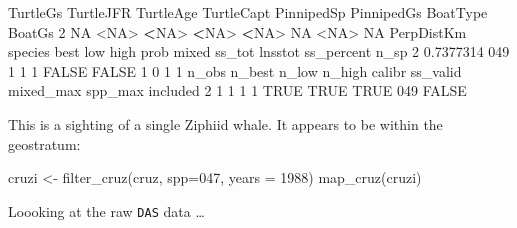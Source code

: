 \documentclass[
]{book}
\newenvironment{Shaded}{\begin{snugshade}}{\end{snugshade}}
\newcommand{\AttributeTok}[1]{\textcolor[rgb]{0.77,0.63,0.00}{#1}}
\newcommand{\ConstantTok}[1]{\textcolor[rgb]{0.00,0.00,0.00}{#1}}
\newcommand{\DecValTok}[1]{\textcolor[rgb]{0.00,0.00,0.81}{#1}}
\newcommand{\ErrorTok}[1]{\textcolor[rgb]{0.64,0.00,0.00}{\textbf{#1}}}
\newcommand{\FloatTok}[1]{\textcolor[rgb]{0.00,0.00,0.81}{#1}}
\newcommand{\FunctionTok}[1]{\textcolor[rgb]{0.00,0.00,0.00}{#1}}
\newcommand{\NormalTok}[1]{#1}
\newcommand{\OtherTok}[1]{\textcolor[rgb]{0.56,0.35,0.01}{#1}}
\newcommand{\SpecialCharTok}[1]{\textcolor[rgb]{0.00,0.00,0.00}{#1}}
\newcommand{\StringTok}[1]{\textcolor[rgb]{0.31,0.60,0.02}{#1}}
\begin{document}
\begin{Shaded}
\begin{Highlighting}[]
\NormalTok{  TurtleGs TurtleJFR TurtleAge TurtleCapt PinnipedSp PinnipedGs BoatType BoatGs}
\DecValTok{2}       \ConstantTok{NA}      \SpecialCharTok{\textless{}}\ConstantTok{NA}\SpecialCharTok{\textgreater{}}      \ErrorTok{\textless{}}\ConstantTok{NA}\SpecialCharTok{\textgreater{}}       \ErrorTok{\textless{}}\ConstantTok{NA}\SpecialCharTok{\textgreater{}}       \ErrorTok{\textless{}}\ConstantTok{NA}\SpecialCharTok{\textgreater{}}         \ConstantTok{NA}     \SpecialCharTok{\textless{}}\ConstantTok{NA}\SpecialCharTok{\textgreater{}}     \ConstantTok{NA}
\NormalTok{  PerpDistKm species best low high  prob mixed ss\_tot lnsstot ss\_percent n\_sp}
\DecValTok{2}  \FloatTok{0.7377314}     \DecValTok{049}    \DecValTok{1}   \DecValTok{1}    \DecValTok{1} \ConstantTok{FALSE} \ConstantTok{FALSE}      \DecValTok{1}       \DecValTok{0}          \DecValTok{1}    \DecValTok{1}
\NormalTok{  n\_obs n\_best n\_low n\_high calibr ss\_valid mixed\_max spp\_max included}
\DecValTok{2}     \DecValTok{1}      \DecValTok{1}     \DecValTok{1}      \DecValTok{1}   \ConstantTok{TRUE}     \ConstantTok{TRUE}      \ConstantTok{TRUE}     \DecValTok{049}    \ConstantTok{FALSE}
\end{Highlighting}
\end{Shaded}

This is a sighting of a single Ziphiid whale. It appears to be within the geostratum:

\begin{Shaded}
\begin{Highlighting}[]
\NormalTok{cruzi }\OtherTok{\textless{}{-}} \FunctionTok{filter\_cruz}\NormalTok{(cruz, }\AttributeTok{spp=}\StringTok{\textquotesingle{}047\textquotesingle{}}\NormalTok{, }\AttributeTok{years =} \DecValTok{1988}\NormalTok{)}
\FunctionTok{map\_cruz}\NormalTok{(cruzi)}
\end{Highlighting}
\end{Shaded}

Loooking at the raw \texttt{DAS} data \ldots{}
\end{document}

